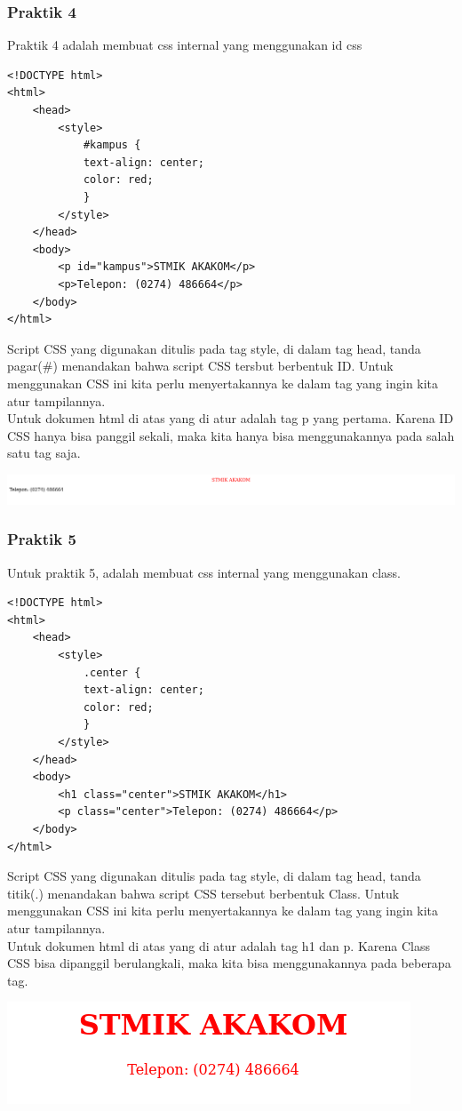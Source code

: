 \documentclass[a4paper,12pt]{article}
\begin{document}
\subsubsection{Praktik 4}
Praktik 4 adalah membuat css internal yang menggunakan id css
\begin{lstlisting}
<!DOCTYPE html>
<html>
    <head>
        <style>
            #kampus {
            text-align: center;
            color: red;
            }
        </style>
    </head>
    <body>
        <p id="kampus">STMIK AKAKOM</p>
        <p>Telepon: (0274) 486664</p>
    </body>
</html>
\end{lstlisting}
Script CSS yang digunakan ditulis pada tag style, di dalam tag head, tanda pagar(\#) menandakan bahwa script CSS tersbut berbentuk ID. Untuk menggunakan CSS ini kita perlu 
menyertakannya ke dalam tag yang ingin kita atur tampilannya.\\
Untuk dokumen html di atas yang di atur adalah tag p yang pertama. Karena ID CSS hanya bisa 
panggil sekali, maka kita hanya bisa menggunakannya pada salah satu tag saja.
\begin{center}
    \includegraphics[scale=0.4]{4.png}
\end{center}

\subsubsection{Praktik 5}
Untuk praktik 5, adalah membuat css internal yang menggunakan class.
\begin{lstlisting}
<!DOCTYPE html>
<html>
    <head>
        <style>
            .center {
            text-align: center;
            color: red;
            }
        </style>
    </head>
    <body>
        <h1 class="center">STMIK AKAKOM</h1>
        <p class="center">Telepon: (0274) 486664</p>
    </body>
</html>
\end{lstlisting}
Script CSS yang digunakan ditulis pada tag style, di dalam tag head, tanda titik(.) menandakan bahwa script CSS tersebut berbentuk Class. Untuk menggunakan CSS ini kita perlu 
menyertakannya ke dalam tag yang ingin kita atur tampilannya.\\
Untuk dokumen html di atas yang di atur adalah tag h1 dan p. Karena Class CSS bisa 
dipanggil berulangkali, maka kita bisa menggunakannya pada beberapa tag.
\begin{center}
    \includegraphics[width=\linewidth]{5.png}
\end{center}
\end{document}
